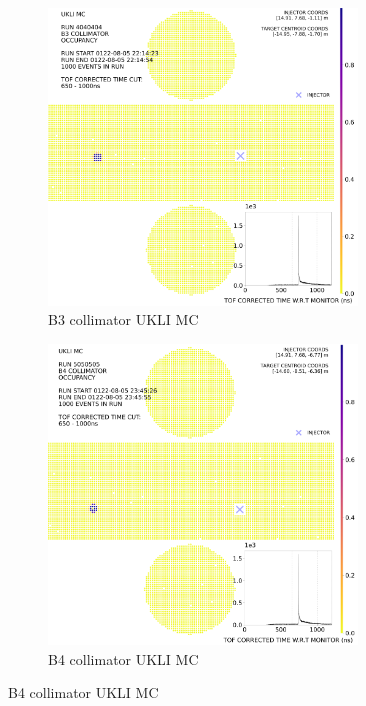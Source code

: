 \begin{figure}[htp]
  
    \begin{subfigure}{0.49\columnwidth}
    \centering
    \includegraphics[width=0.9\textwidth]{Figures/ukli_mc_B3.PNG}
    \caption{B3 collimator UKLI MC}
    \label{fig:time3}
    \end{subfigure}\hfill
    \begin{subfigure}{0.49\columnwidth}
    \centering
    \includegraphics[width=0.9\textwidth]{Figures/ukli_mc_B4.PNG}
    \caption{B4 collimator UKLI MC}
    \label{fig:time4}
    \end{subfigure}
    


\end{figure}
